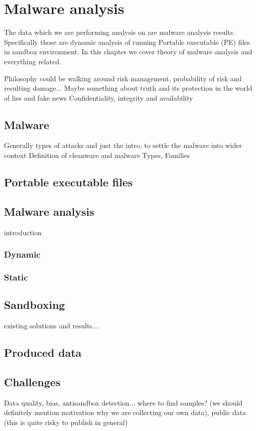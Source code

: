 \chapter{Malware analysis}
The data which we are performing analysis on are malware analysis results. Specifically those are dynamic analysis of running Portable executable (PE) files in sandbox environment. In this chapter we cover theory of malware analysis and everything related. 

Philosophy could be walking around risk management, probability of risk and resulting damage...
Maybe something about truth and its protection in the world of lies and fake news
Confidentiality, integrity and availability


\section{Malware}
Generally types of attacks and just the intro, to settle the malware into wider context
Definition of cleanware and malware
Types, Families

\section{Portable executable files}

\section{Malware analysis}
introduction
\subsection{Dynamic}
\subsection{Static}

\section{Sandboxing}
existing solutions and results...
\section{Produced data}

\section{Challenges}
Data quality, bias, antisandbox detection... where to find samples? (we should definitely mention motivation why we are collecting our own data), public data (this is quite risky to publish in general)

